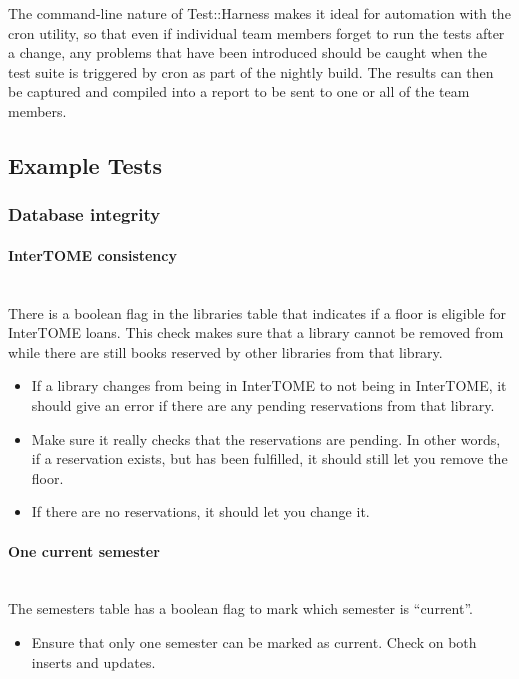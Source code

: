 \documentclass[12pt,titlepage]{article}
\begin{document}
The command-line nature of Test::Harness makes it ideal for automation with the cron utility, so that even if individual team members forget to run the tests after a change, any problems that have been introduced should be caught when the test suite is triggered by cron as part of the nightly build.  The results can then be captured and compiled into a report to be sent to one or all of the team members.

\subsection{Example Tests}
\subsubsection{Database integrity}
\paragraph{InterTOME consistency} 
\hspace{1pt}\\ There is a boolean flag in the libraries table that indicates if a floor is eligible for InterTOME loans. This check makes sure that a library cannot be removed from while there are still books reserved by other libraries from that library.
\begin{itemize}
	\item If a library changes from being in InterTOME to not being in InterTOME, it should give an error if there are any pending reservations from that library.
	\item Make sure it really checks that the reservations are pending. In other words, if a reservation exists, but has been fulfilled, it should still let you remove the floor.
	\item If there are no reservations, it should let you change it.
\end{itemize}

\paragraph{One current semester}
\hspace{1pt}\\ The semesters table has a boolean flag to mark which semester is ``current''.
\begin{itemize}
	\item Ensure that only one semester can be marked as current. Check on both inserts and updates.
\end{itemize}
\end{document}
